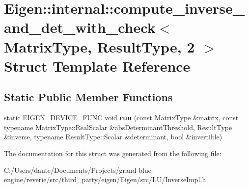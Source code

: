 \hypertarget{struct_eigen_1_1internal_1_1compute__inverse__and__det__with__check_3_01_matrix_type_00_01_result_type_00_012_01_4}{}\section{Eigen\+::internal\+::compute\+\_\+inverse\+\_\+and\+\_\+det\+\_\+with\+\_\+check$<$ Matrix\+Type, Result\+Type, 2 $>$ Struct Template Reference}
\label{struct_eigen_1_1internal_1_1compute__inverse__and__det__with__check_3_01_matrix_type_00_01_result_type_00_012_01_4}
\subsection*{Static Public Member Functions}
\begin{DoxyCompactItemize}
\item 
\mbox{\label{struct_eigen_1_1internal_1_1compute__inverse__and__det__with__check_3_01_matrix_type_00_01_result_type_00_012_01_4_a520ba3dc958c01e4bbcf965f1764ba90}} 
static E\+I\+G\+E\+N\+\_\+\+D\+E\+V\+I\+C\+E\+\_\+\+F\+U\+NC void {\bfseries run} (const Matrix\+Type \&matrix, const typename Matrix\+Type\+::\+Real\+Scalar \&abs\+Determinant\+Threshold, Result\+Type \&inverse, typename Result\+Type\+::\+Scalar \&determinant, bool \&invertible)
\end{DoxyCompactItemize}


The documentation for this struct was generated from the following file\+:\begin{DoxyCompactItemize}
\item 
C\+:/\+Users/dante/\+Documents/\+Projects/grand-\/blue-\/engine/reverie/src/third\+\_\+party/eigen/\+Eigen/src/\+L\+U/Inverse\+Impl.\+h\end{DoxyCompactItemize}
